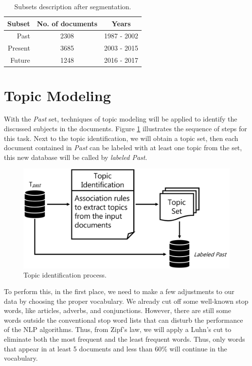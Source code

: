 \begin{table}[h!]
	\centering
	\caption{Subsets description after segmentation.}
	\label{tab:database-description}
	\begin{tabular}{r|cc}
		\toprule
		 Subset & No. of documents &    Years    \\ \midrule
		   Past &       2308       & 1987 - 2002 \\
		Present &       3685       & 2003 - 2015 \\
		 Future &       1248       & 2016 - 2017 \\ \bottomrule
	\end{tabular}
\end{table}

\section{Topic Modeling}

With the \textit{Past} set, techniques of topic modeling will be applied to identify the discussed subjects in the documents. Figure \ref{fig:topic-identification} illustrates the sequence of steps for this task. Next to the topic identification, we will obtain a topic set, then each document contained in \textit{Past} can be labeled with at least one topic from the set, this new database will be called by \textit{labeled Past}.

\begin{figure}[h!]
	\centering
	\includegraphics[width=0.8\linewidth]{01.Chapters/04.Materials/topic-identification}
	\caption{Topic identification process.}
	\label{fig:topic-identification}
\end{figure}

To perform this, in the first place, we need to make a few adjustments to our data by choosing the proper vocabulary. We already cut off some well-known stop words, like articles, adverbs, and conjunctions. However, there are still some words outside the conventional stop word lists that can disturb the performance of the NLP algorithms. Thus, from Zipf's law, we will apply a Luhn's cut
to eliminate both the most frequent and the least frequent words. Thus, only words that appear in at least 5 documents and less than 60\% will continue in the vocabulary.


